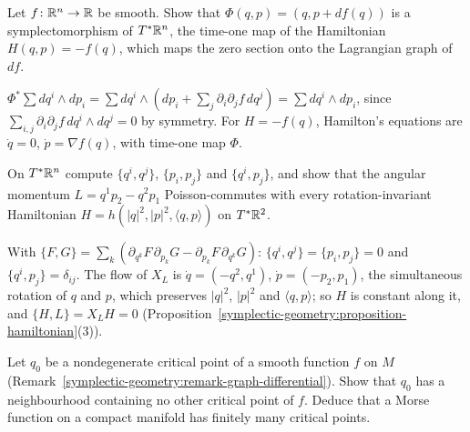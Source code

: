 \begin{exercise}\label{symplectic-geometry:exercise-generating-function}
Let $f \colon \mathbb{R}^n \to \mathbb{R}$ be smooth. Show that $\Phi(q, p) = (q, p + df(q))$ is a symplectomorphism of $T^*\mathbb{R}^n$, the time-one map of the Hamiltonian $H(q, p) = -f(q)$, which maps the zero section onto the
Lagrangian graph of $df$.
\end{exercise}

\begin{solution}
$\Phi^*\sum dq^i \wedge dp_i = \sum dq^i \wedge (dp_i + \sum_j\partial_i\partial_jf\,dq^j) = \sum dq^i \wedge dp_i$, since $\sum_{i,j}\partial_i\partial_jf\,dq^i \wedge dq^j = 0$ by symmetry. For $H = -f(q)$,
Hamilton's equations are $\dot q = 0$, $\dot p = \nabla f(q)$, with time-one map $\Phi$.
\end{solution}

\begin{exercise}\label{symplectic-geometry:exercise-poisson-r2n}
On $T^*\mathbb{R}^n$ compute $\{q^i, q^j\}$, $\{p_i, p_j\}$ and $\{q^i, p_j\}$, and show that the angular momentum $L = q^1p_2 - q^2p_1$ Poisson-commutes with every rotation-invariant Hamiltonian
$H = h(|q|^2, |p|^2, \langle q, p\rangle)$ on $T^*\mathbb{R}^2$.
\end{exercise}

\begin{solution}
With $\{F, G\} = \sum_k(\partial_{q^k}F\,\partial_{p_k}G - \partial_{p_k}F\,\partial_{q^k}G)$: $\{q^i, q^j\} = \{p_i, p_j\} = 0$ and $\{q^i, p_j\} = \delta_{ij}$. The flow of $X_L$ is $\dot q = (-q^2, q^1)$,
$\dot p = (-p_2, p_1)$, the simultaneous rotation of $q$ and $p$, which preserves $|q|^2$, $|p|^2$ and $\langle q, p\rangle$; so $H$ is constant along it, and $\{H, L\} = X_LH = 0$
(Proposition~\ref{symplectic-geometry:proposition-hamiltonian}(3)).
\end{solution}

\begin{exercise}\label{symplectic-geometry:exercise-morse-isolated}
Let $q_0$ be a nondegenerate critical point of a smooth function $f$ on $M$ (Remark~\ref{symplectic-geometry:remark-graph-differential}). Show that $q_0$ has a neighbourhood containing no other critical
point of $f$. Deduce that a Morse function on a compact manifold has finitely many critical points.
\end{exercise}

